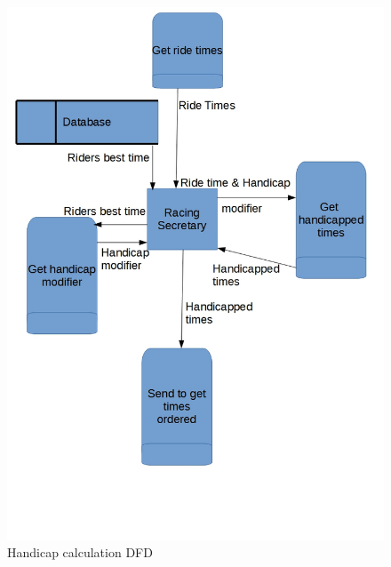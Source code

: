 \begin{figure}[H]
    \includegraphics[width=\textwidth]{./DFD/Done/JPG/HandicapDFD.jpg}
    \caption{Handicap calculation DFD} \label{fig:Handicap Calculation DFD}
\end{figure}

